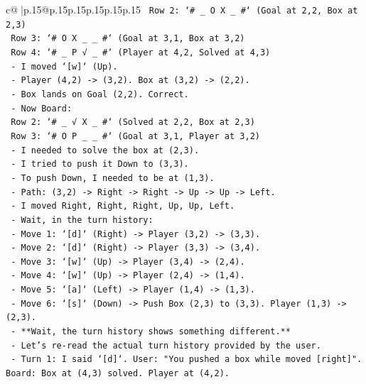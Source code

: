 \documentclass{article}
\begin{document}
{\begin{supertabular}{c@{$\;$}|p{.15\linewidth}@{}p{.15\linewidth}p{.15\linewidth}p{.15\linewidth}p{.15\linewidth}p{.15\linewidth}}
{{{\texttt{        Row 2: `\# \_ O X \_ \#` (Goal at 2,2, Box at 2,3)} \\
\texttt{        Row 3: `\# O X \_ \_ \#` (Goal at 3,1, Box at 3,2)} \\
\texttt{        Row 4: `\# \_ P √ \_ \#` (Player at 4,2, Solved at 4,3)} \\
\texttt{      {-} I moved `{[}w{]}` (Up).} \\
\texttt{      {-} Player (4,2) {-}> (3,2). Box at (3,2) {-}> (2,2).} \\
\texttt{      {-} Box lands on Goal (2,2). Correct.} \\
\texttt{      {-} Now Board:} \\
\texttt{        Row 2: `\# \_ √ X \_ \#` (Solved at 2,2, Box at 2,3)} \\
\texttt{        Row 3: `\# O P \_ \_ \#` (Goal at 3,1, Player at 3,2)} \\
\texttt{      {-} I needed to solve the box at (2,3).} \\
\texttt{      {-} I tried to push it Down to (3,3).} \\
\texttt{      {-} To push Down, I needed to be at (1,3).} \\
\texttt{      {-} Path: (3,2) {-}> Right {-}> Right {-}> Up {-}> Up {-}> Left.} \\
\texttt{      {-} I moved Right, Right, Right, Up, Up, Left.} \\
\texttt{      {-} Wait, in the turn history:} \\
\texttt{        {-} Move 1: `{[}d{]}` (Right) {-}> Player (3,2) {-}> (3,3).} \\
\texttt{        {-} Move 2: `{[}d{]}` (Right) {-}> Player (3,3) {-}> (3,4).} \\
\texttt{        {-} Move 3: `{[}w{]}` (Up) {-}> Player (3,4) {-}> (2,4).} \\
\texttt{        {-} Move 4: `{[}w{]}` (Up) {-}> Player (2,4) {-}> (1,4).} \\
\texttt{        {-} Move 5: `{[}a{]}` (Left) {-}> Player (1,4) {-}> (1,3).} \\
\texttt{        {-} Move 6: `{[}s{]}` (Down) {-}> Push Box (2,3) to (3,3). Player (1,3) {-}> (2,3).} \\
\texttt{      {-} **Wait, the turn history shows something different.**} \\
\texttt{      {-} Let's re{-}read the actual turn history provided by the user.} \\
\texttt{        {-} Turn 1: I said `{[}d{]}`. User: "You pushed a box while moved {[}right{]}". Board: Box at (4,3) solved. Player at (4,2).} \\
}}}
\end{supertabular}}
\end{document}
